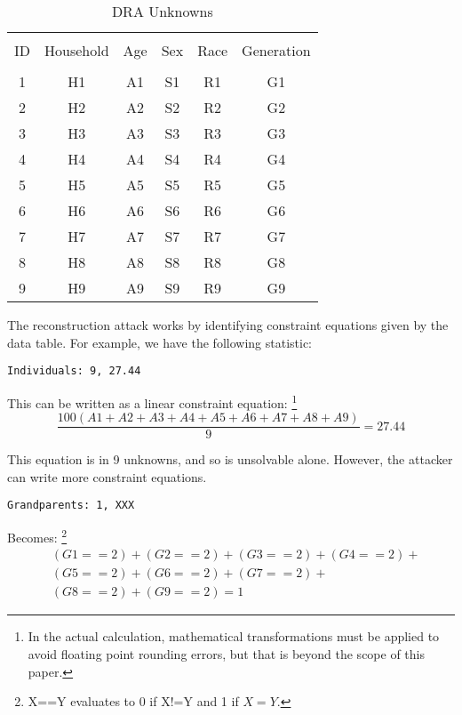 \documentclass[jou,apacite]{apa6}
\begin{document}
\begin{table}[!htb]
\caption{DRA Unknowns}\label{tab6}
\begin{tabular}{c|c|c|c|c|c}
\hline\\[-1.5ex]
ID & Household & Age & Sex & Race & Generation \\[0.5ex]
\hline\\[-1.5ex]
1 & H1 & A1 & S1 & R1 & G1  \\[0.5ex]
2 & H2 & A2 & S2 & R2 & G2  \\[0.5ex]
3 & H3 & A3 & S3 & R3 & G3  \\[0.5ex]
4 & H4 & A4 & S4 & R4 & G4  \\[0.5ex]
5 & H5 & A5 & S5 & R5 & G5  \\[0.5ex]
6 & H6 & A6 & S6 & R6 & G6  \\[0.5ex]
7 & H7 & A7 & S7 & R7 & G7  \\[0.5ex]
8 & H8 & A8 & S8 & R8 & G8  \\[0.5ex]
9 & H9 & A9 & S9 & R9 & G9  \\[0.5ex]
\hline
\end{tabular}
\end{table}

The reconstruction attack works by identifying constraint
equations given by the data table. For example, we have the
following statistic:
\begin{verbatim}
Individuals: 9, 27.44
\end{verbatim}

This can be written as a linear constraint equation: \footnote{In the actual calculation, mathematical transformations must be applied to avoid floating point rounding errors, but that is beyond the scope of this paper.}
\[\frac{100(A1 + A2 + A3 + A4 + A5 + A6 + A7 + A8 + A9)}{9} = 27.44\]

This equation is in 9 unknowns, and so is unsolvable alone.
However, the attacker can write more constraint equations.

\begin{verbatim}
Grandparents: 1, XXX
\end{verbatim}


Becomes: \footnote{X==Y evaluates to 0 if X!=Y and 1 if $X=Y$.}
\begin{align*}
& (G1==2) + (G2==2) + (G3==2) + (G4==2) + \\
& (G5==2)+ (G6==2) + (G7==2) +\\
& (G8==2) + (G9==2) = 1
\end{align*}
\end{document}
